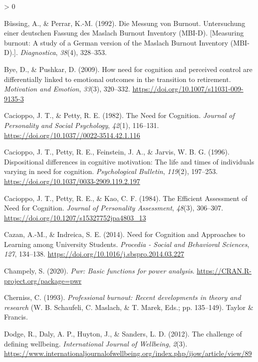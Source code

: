 \documentclass[
  english,
  man,floatsintext]{apa6}
\newlength{\cslhangindent}
\newenvironment{CSLReferences}[2] %
 {%
  \setlength{\parindent}{0pt}
  \ifodd #1 \everypar{\setlength{\hangindent}{\cslhangindent}}\ignorespaces\fi
  \ifnum #2 > 0
  \setlength{\parskip}{#2\baselineskip}
  \fi
 }%
 {}
\begin{document}
\begin{CSLReferences}{1}{0}
\leavevmode\hypertarget{ref-Buessing1992}{}%
Büssing, A., \& Perrar, K.-M. (1992). Die {Messung} von {Burnout}. {Untersuchung} einer deutschen {Fassung} des {Maslach} {Burnout} {Inventory} ({MBI}-{D}). {[}{Measuring} burnout: {A} study of a {German} version of the {Maslach} {Burnout} {Inventory} ({MBI}-{D}).{]}. \emph{Diagnostica}, \emph{38}(4), 328--353.

\leavevmode\hypertarget{ref-Bye2009}{}%
Bye, D., \& Pushkar, D. (2009). How need for cognition and perceived control are differentially linked to emotional outcomes in the transition to retirement. \emph{Motivation and Emotion}, \emph{33}(3), 320--332. \url{https://doi.org/10.1007/s11031-009-9135-3}

\leavevmode\hypertarget{ref-Cacioppo1982}{}%
Cacioppo, J. T., \& Petty, R. E. (1982). The {Need} for {Cognition}. \emph{Journal of Personality and Social Psychology}, \emph{42}(1), 116--131. \url{https://doi.org/10.1037//0022-3514.42.1.116}

\leavevmode\hypertarget{ref-Cacioppo1996}{}%
Cacioppo, J. T., Petty, R. E., Feinstein, J. A., \& Jarvis, W. B. G. (1996). Dispositional differences in cognitive motivation: {The} life and times of individuals varying in need for cognition. \emph{Psychological Bulletin}, \emph{119}(2), 197--253. \url{https://doi.org/10.1037/0033-2909.119.2.197}

\leavevmode\hypertarget{ref-Cacioppo1984}{}%
Cacioppo, J. T., Petty, R. E., \& Kao, C. F. (1984). The {Efficient} {Assessment} of {Need} for {Cognition}. \emph{Journal of Personality Assessment}, \emph{48}(3), 306--307. \url{https://doi.org/10.1207/s15327752jpa4803_13}

\leavevmode\hypertarget{ref-Cazan2014}{}%
Cazan, A.-M., \& Indreica, S. E. (2014). Need for {Cognition} and {Approaches} to {Learning} among {University} {Students}. \emph{Procedia - Social and Behavioral Sciences}, \emph{127}, 134--138. \url{https://doi.org/10.1016/j.sbspro.2014.03.227}

\leavevmode\hypertarget{ref-Champely2020}{}%
Champely, S. (2020). \emph{Pwr: Basic functions for power analysis}. \url{https://CRAN.R-project.org/package=pwr}

\leavevmode\hypertarget{ref-Cherniss1993}{}%
Cherniss, C. (1993). \emph{Professional burnout: Recent developments in theory and research} (W. B. Schaufeli, C. Maslach, \& T. Marek, Eds.; pp. 135--149). Taylor \& Francis.

\leavevmode\hypertarget{ref-Dodge2012}{}%
Dodge, R., Daly, A. P., Huyton, J., \& Sanders, L. D. (2012). The challenge of defining wellbeing. \emph{International Journal of Wellbeing}, \emph{2}(3). \url{https://www.internationaljournalofwellbeing.org/index.php/ijow/article/view/89}


\end{CSLReferences}
\end{document}
